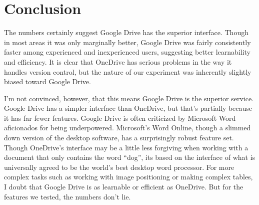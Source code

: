 \documentclass[a4paper,12pt]{article}
\begin{document}
\section{Conclusion}

The numbers certainly suggest Google Drive has the superior interface. Though in most areas it was only marginally better, Google Drive was fairly consistently faster among experienced and inexperienced users, suggesting better learnability and efficiency. It is clear that OneDrive has serious problems in the way it handles version control, but the nature of our experiment was inherently slightly biased toward Google Drive.

I'm not convinced, however, that this means Google Drive is the superior service. Google Drive has a simpler interface than OneDrive, but that's partially because it has far fewer features. Google Drive is often criticized by Microsoft Word aficionados for being underpowered. Microsoft's Word Online, though a slimmed down version of the desktop software, has a surprisingly robust feature set. Though OneDrive's interface may be a little less forgiving when working with a document that only contains the word ``dog'', its based on the interface of what is universally agreed to be the world's best desktop word processor. For more complex tasks such as working with image positioning or making complex tables, I doubt that Google Drive is as learnable or efficient as OneDrive. But for the features we tested, the numbers don't lie.
\end{document}
